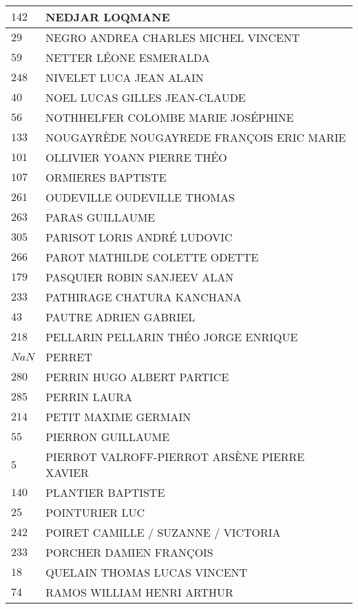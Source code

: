 \begin{xltabular}{\linewidth}{|l|X|}
    \hline
    $142$ & NEDJAR LOQMANE \\
    \hline
    $29$ & NEGRO ANDREA CHARLES MICHEL VINCENT \\
    \hline
    $59$ & NETTER LÉONE ESMERALDA \\
    \hline
    $248$ & NIVELET LUCA JEAN ALAIN \\
    \hline
    $40$ & NOEL LUCAS GILLES JEAN-CLAUDE \\
    \hline
    $56$ & NOTHHELFER COLOMBE MARIE JOSÉPHINE \\
    \hline
    $133$ & NOUGAYRÈDE NOUGAYREDE FRANÇOIS ERIC MARIE \\
    \hline
    $101$ & OLLIVIER YOANN PIERRE THÉO \\
    \hline
    $107$ & ORMIERES BAPTISTE \\
    \hline
    $261$ & OUDEVILLE OUDEVILLE THOMAS \\
    \hline
    $263$ & PARAS GUILLAUME \\
    \hline
    $305$ & PARISOT LORIS ANDRÉ LUDOVIC \\
    \hline
    $266$ & PAROT MATHILDE COLETTE ODETTE \\
    \hline
    $179$ & PASQUIER ROBIN SANJEEV ALAN \\
    \hline
    $233$ & PATHIRAGE CHATURA KANCHANA \\
    \hline
    $43$ & PAUTRE ADRIEN GABRIEL \\
    \hline
    $218$ & PELLARIN PELLARIN THÉO JORGE ENRIQUE \\
    \hline
    $NaN$ & PERRET \\
    \hline
    $280$ & PERRIN HUGO ALBERT PARTICE \\
    \hline
    $285$ & PERRIN LAURA \\
    \hline
    $214$ & PETIT MAXIME GERMAIN \\
    \hline
    $55$ & PIERRON GUILLAUME \\
    \hline
    $5$ & PIERROT VALROFF-PIERROT ARSÈNE PIERRE XAVIER \\
    \hline
    $140$ & PLANTIER BAPTISTE \\
    \hline
    $25$ & POINTURIER LUC \\
    \hline
    $242$ & POIRET CAMILLE / SUZANNE / VICTORIA \\
    \hline
    $233$ & PORCHER DAMIEN FRANÇOIS \\
    \hline
    $18$ & QUELAIN THOMAS LUCAS VINCENT \\
    \hline
    $74$ & RAMOS WILLIAM HENRI ARTHUR \\

\end{xltabular}
